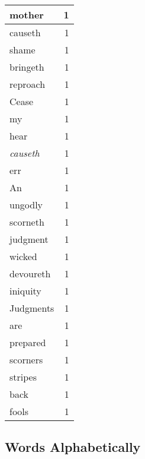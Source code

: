 \begin{center}
\begin{longtable}{l|r}
mother & 1\\ \hline 
causeth & 1\\ \hline 
shame & 1\\ \hline 
bringeth & 1\\ \hline 
reproach & 1\\ \hline 
Cease & 1\\ \hline 
my & 1\\ \hline 
hear & 1\\ \hline 
\emph{causeth} & 1\\ \hline 
err & 1\\ \hline 
An & 1\\ \hline 
ungodly & 1\\ \hline 
scorneth & 1\\ \hline 
judgment & 1\\ \hline 
wicked & 1\\ \hline 
devoureth & 1\\ \hline 
iniquity & 1\\ \hline 
Judgments & 1\\ \hline 
are & 1\\ \hline 
prepared & 1\\ \hline 
scorners & 1\\ \hline 
stripes & 1\\ \hline 
back & 1\\ \hline 
fools & 1\\ \hline 
\end{longtable}  
\end{center}  


  
\normalsize  

  
  


\subsection{Words Alphabetically}

